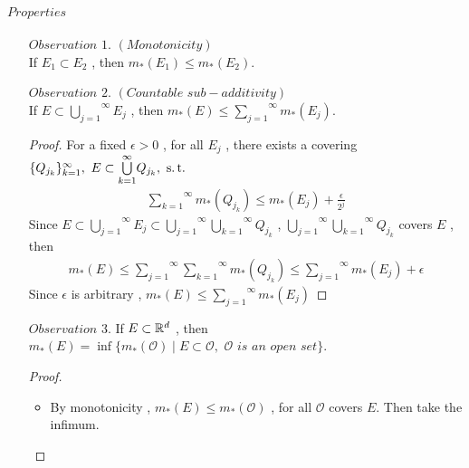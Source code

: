 \paragraph{$Properties$}
	\begin{enumerate}
		\item[$Observation \,\, 1.$]$(Monotonicity)$ \\
		If $E_1 \subset E_2$ , then $m_{*}(E_1) \leq m_{*}(E_2)$.
		
		\vspace*{2em}
		\item[$Observation \,\, 2.$]$(Countable \,\, sub-additivity)$\\
		If $E \subset \overset{\infty}{\underset{j = 1}{\bigcup}}{E_j}$ , then $m_{*}(E) \leq \overset{\infty}{\underset{j = 1}{\sum}}{m_{*}(E_j)}$.
		
		\vspace*{2em}
		\begin{proof}
			For a fixed $\epsilon > 0$ , for all $E_j$ , there exists a covering $\{ Q_{j_k} \}_{k = 1}^{\infty} , \,\, E \subset \overset{\infty}{\underset{k = 1}{\bigcup}}{Q_{j_k}} , \,\, \operatorname{s.t.}$
			\begin{align}
				\overset{\infty}{\underset{k = 1}{\sum}}{m_{*}(Q_{j_k})} \leq m_{*}(E_j) + \frac{\epsilon}{2^j}
			\end{align}
			Since $E \subset \overset{\infty}{\underset{j = 1}{\bigcup}}{E_j} \subset \overset{\infty}{\underset{j = 1}{\bigcup}}\overset{\infty}{\underset{k = 1}{\bigcup}}{Q_{j_k}}$ , $\overset{\infty}{\underset{j = 1}{\bigcup}}\overset{\infty}{\underset{k = 1}{\bigcup}}{Q_{j_k}}$ covers $E$ , then
			\begin{align}
				m_{*}(E) \leq \overset{\infty}{\underset{j = 1}{\sum}}\overset{\infty}{\underset{k = 1}{\sum}}{m_{*}(Q_{j_k})} \leq \overset{\infty}{\underset{j = 1}{\sum}}{m_{*}(E_j)} + \epsilon
			\end{align}
			Since $\epsilon$ is arbitrary , $m_{*}(E) \leq \overset{\infty}{\underset{j = 1}{\sum}}{m_{*}(E_j)}$
		\end{proof}
		
		\vspace*{2em}
		\item[$Observation \,\, 3.$]\label{observation 1.2.3}If $E \subset \mathbb{R}^d$ , then $m_{*}(E) = \inf{\{ m_{*}(\mathcal{O}) \mid E \subset \mathcal{O} , \,\, \mathcal{O} \,\, is \,\, an \,\, open \,\, set \}}$.\\
		
		\vspace*{2em}
		\begin{proof}
			\begin{itemize}
				\item By monotonicity , $m_{*}(E) \leq m_{*}(\mathcal{O})$ , for all $\mathcal{O}$ covers $E$. Then take the infimum.
				

\end{itemize}
\end{proof}
\end{enumerate}
